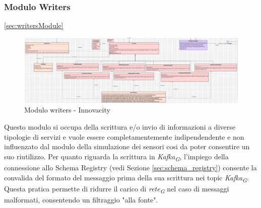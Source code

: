 \subsubsection{Modulo Writers} \ref*{sec:writersModule}
\begin{figure}[H]
    \centering
    \includegraphics[width=1\textwidth]{../Images/SpecificaTecnica/simulatoriSensori.PNG}
    \caption{Modulo writers - Innovacity}
    \label{fig: fdsd}
\end{figure}

Questo modulo si occupa della scrittura e/o invio di informazioni a diverse tipologie di servizi e vuole essere completamentemente indipendendente e non influenzato dal modulo della simulazione dei sensori cosi da poter consentire un suo riutilizzo.
Per quanto riguarda la scrittura in \textit{Kafka}\textsubscript{\textit{G}}, l'impiego della connessione allo Schema Registry (vedi Sezione \ref{sec:schema_registry}) consente la convalida del formato del messaggio prima della sua scrittura nei topic \textit{Kafka}\textsubscript{\textit{G}}. Questa pratica permette di ridurre il carico di \textit{rete}\textsubscript{\textit{G}} nel caso di messaggi malformati, consentendo un filtraggio "alla fonte".

